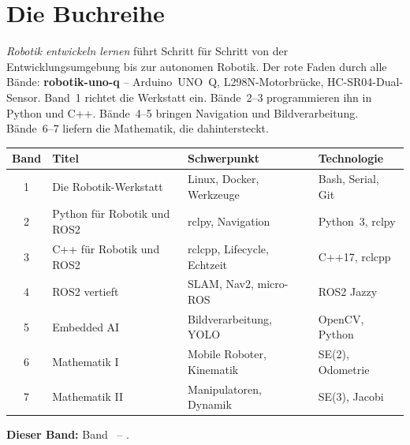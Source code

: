 
\chapter*{Die Buchreihe}

\noindent
\textit{Robotik entwickeln lernen} führt Schritt für Schritt von der
Entwicklungsumgebung bis zur autonomen Robotik.
Der rote Faden durch alle Bände: \textbf{robotik-uno-q} --
Arduino~UNO~Q, L298N-Motorbrücke, HC-SR04-Dual-Sensor.
Band~1 richtet die Werkstatt ein. Bände~2--3 programmieren ihn
in Python und C++. Bände~4--5 bringen Navigation und Bildverarbeitung.
Bände~6--7 liefern die Mathematik, die dahintersteckt.

\bigskip

\begin{center}
\renewcommand{\arraystretch}{1.35}
\begin{tabular}{clll}
\hline
\textbf{Band} & \textbf{Titel} & \textbf{Schwerpunkt} & \textbf{Technologie} \\
\hline
1 & Die Robotik-Werkstatt       & Linux, Docker, Werkzeuge    & Bash, Serial, Git \\
2 & Python für Robotik und ROS2 & rclpy, Navigation           & Python~3, rclpy \\
3 & C++ für Robotik und ROS2    & rclcpp, Lifecycle, Echtzeit & C++17, rclcpp \\
4 & ROS2 vertieft               & SLAM, Nav2, micro-ROS       & ROS2 Jazzy \\
5 & Embedded AI                 & Bildverarbeitung, YOLO      & OpenCV, Python \\
6 & Mathematik I                & Mobile Roboter, Kinematik   & SE(2), Odometrie \\
7 & Mathematik II               & Manipulatoren, Dynamik      & SE(3), Jacobi \\
\hline
\end{tabular}
\end{center}

\bigskip\noindent
\textbf{Dieser Band:} Band~\BandNummer{} -- \textit{\BandTitel}.

\newpage
